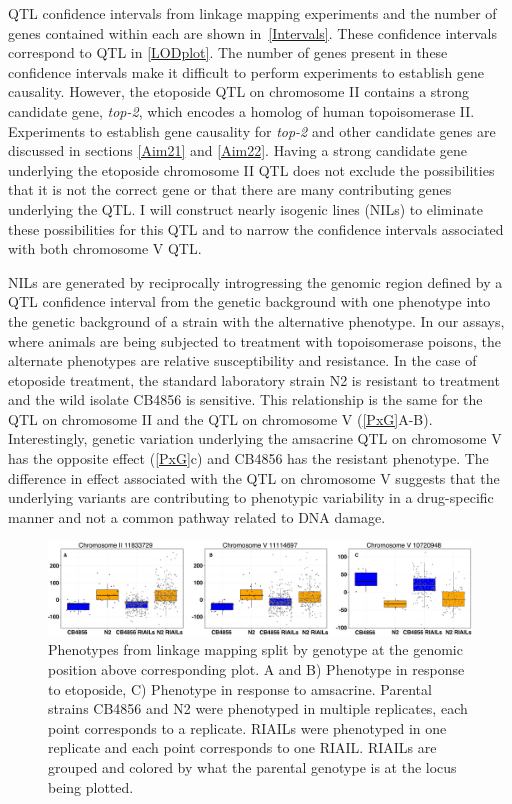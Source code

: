 \documentclass[12pt]{article}
\begin{document}
QTL confidence intervals from linkage mapping experiments and the number of genes contained within each are shown in~\autoref{Intervals}. These confidence intervals correspond to QTL in \autoref{LODplot}. The number of genes present in these confidence intervals make it difficult to perform experiments to establish gene causality. However, the etoposide QTL on chromosome II contains a strong candidate gene, {\it top-2}, which encodes a homolog of human topoisomerase II\textalpha. Experiments to establish gene causality for {\it top-2} and other candidate genes are discussed in sections \ref{Aim21} and \ref{Aim22}. Having a strong candidate gene underlying the etoposide chromosome II QTL does not exclude the possibilities that it is not the correct gene or that there are many contributing genes underlying the QTL. I will construct nearly isogenic lines (NILs) to eliminate these possibilities for this QTL and to narrow the confidence intervals associated with both chromosome V QTL.

\vspace{5pt}

NILs are generated by reciprocally introgressing the genomic region defined by a QTL confidence interval from the genetic background with one phenotype into the genetic background of a strain with the alternative phenotype. In our assays, where animals are being subjected to treatment with topoisomerase poisons, the alternate phenotypes are relative susceptibility and resistance. In the case of etoposide treatment, the standard laboratory strain N2 is resistant to treatment and the wild isolate CB4856 is sensitive. This relationship is the same for the QTL on chromosome II and the QTL on chromosome V (\autoref{PxG}A-B). Interestingly, genetic variation underlying the amsacrine QTL on chromosome V has the opposite effect (\autoref{PxG}c) and CB4856 has the resistant phenotype. The difference in effect associated with the QTL on chromosome V suggests that the underlying variants are contributing to phenotypic variability in a drug-specific manner and not a common pathway related to DNA damage. 

\begin{figure}[h]
\captionsetup{font=tiny}
\centering
\includegraphics[scale=0.25]{Figures/Figure2.pdf}

\caption[Phenotype by genotype splits for QTL]{Phenotypes from linkage mapping split by genotype at the genomic position above corresponding plot. A and B) Phenotype in response to etoposide, C) Phenotype in response to amsacrine. Parental strains CB4856 and N2 were phenotyped in multiple replicates, each point corresponds to a replicate. RIAILs were phenotyped in one replicate and each point corresponds to one RIAIL. RIAILs are grouped and colored by what the parental genotype is at the locus being plotted.}
\label{PxG}
\end{figure}
\end{document}
